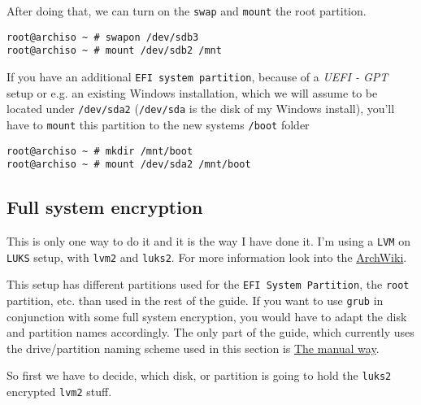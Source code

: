 \documentclass[9pt]{report}
\newenvironment{NOTE}
{\begin{tcolorbox}[colback=admonitionBG,coltitle=draculaFG,colframe=draculaBlue,colbacktitle=draculaBlue,title=NOTE]}
{\end{tcolorbox}}
\begin{document}
After doing that, we can turn on the \texttt{swap} and \texttt{mount} the root partition.


\begin{verbatim}
root@archiso ~ # swapon /dev/sdb3
root@archiso ~ # mount /dev/sdb2 /mnt
\end{verbatim}

\begin{NOTE}
    If you have an additional \texttt{EFI system partition}, because of a \emph{UEFI - GPT} setup or e.g. an existing Windows installation, which we will assume to be located under \texttt{/dev/sda2} (\texttt{/dev/sda} is the disk of my Windows install), you’ll have to \texttt{mount} this partition to the new systems \texttt{/boot} folder


    \begin{verbatim}
root@archiso ~ # mkdir /mnt/boot
root@archiso ~ # mount /dev/sda2 /mnt/boot
    \end{verbatim}
\end{NOTE}

\newpage

\hypertarget{x-full-system-encryption}{\subsection{Full system encryption}}
\begin{NOTE}
    This is only one way to do it and it is the way I have done it.
    I’m using a \texttt{LVM} on \texttt{LUKS} setup, with \texttt{lvm2} and \texttt{luks2}.
    For more information look into the \href{https://wiki.archlinux.org/}{ArchWiki}.

\end{NOTE}
\begin{NOTE}
    This setup has different partitions used for the \texttt{EFI System Partition}, the \texttt{root} partition, etc. than used in the rest of the guide.
    If you want to use \texttt{grub} in conjunction with some full system encryption, you would have to adapt the disk and partition names accordingly.
    The only part of the guide, which currently uses the drive/partition naming scheme used in this section is \hyperlink{manual-secure-boot-setup}{The manual way}.

\end{NOTE}

\newpage

So first we have to decide, which disk, or partition is going to hold the \texttt{luks2} encrypted \texttt{lvm2} stuff.
\end{document}
